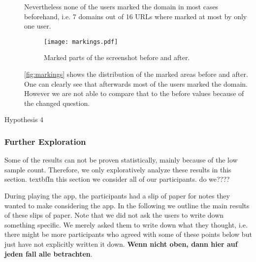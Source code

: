 \begin{description}
Nevertheless none of the users marked the domain in most cases beforehand, i.e. 7 domains out of 16 URLs where marked at most by only one user.
\begin{figure}
\centering
\texttt{[image: markings.pdf]}
\caption{Marked parts of the screenshot before and after.}
\label{fig:markings}
\end{figure}
\autoref{fig:markings} shows the distribution of the marked areas before and after. One can clearly see that afterwards most of the users marked the domain. However we are not able to compare that to the before values because of the changed question.
\item[Hypothesis 4]
\end{description}


\subsubsection{Further Exploration}
Some of the results can not be proven statistically, mainly because of the low sample count. 
Therefore, we only exploratively analyze these results in this section.
textbf{In this section we consider all of our participants. do we????} 

\begin{description}[leftmargin=0cm]
	\item[text]
\end{description}


During playing the app, the participants had a slip of paper for notes they wanted to make considering the app.
In the following we outline the main results of these slips of paper.
Note that we did not ask the users to write down something specific. 
We merely asked them to write down what they thought, i.e. there might be more participants who agreed with some of these points below but just have not explicitly written it down.
\textbf{Wenn nicht oben, dann hier auf jeden fall alle betrachten}.

